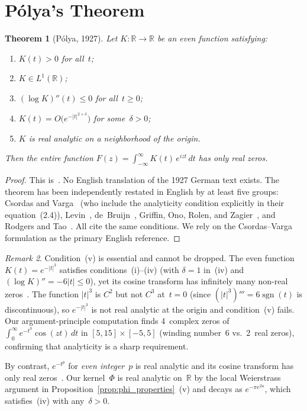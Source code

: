 \documentclass[11pt]{article}
\newtheorem{theorem}{Theorem}
\theoremstyle{definition}
\theoremstyle{remark}
\newtheorem{remark}[theorem]{Remark}
\begin{document}
\section{P\'olya's Theorem}
\label{sec:polya}

\begin{theorem}[P\'olya, 1927]\label{thm:polya}
Let $K : \mathbb{R} \to \mathbb{R}$ be an even function satisfying:
\begin{enumerate}[label=(\roman*)]
\item $K(t) > 0$ for all~$t$;
\item $K \in L^1(\mathbb{R})$;
\item $(\log K)''(t) \leq 0$ for all~$t \geq 0$;
\item $K(t) = O\bigl(e^{-|t|^{2+\delta}}\bigr)$ for some~$\delta > 0$;
\item $K$ is real analytic on a neighborhood of the origin.
\end{enumerate}
Then the entire function $F(z) = \int_{-\infty}^{\infty} K(t)\,e^{izt}\,dt$ has only real zeros.
\end{theorem}

\begin{proof}
This is~\cite[Satz~II]{polya1927}. No English translation of the 1927 German text exists. The theorem has been independently restated in English by at least five groups: Csordas and Varga~\cite[Theorem~2.2]{csordas1989} (who include the analyticity condition explicitly in their equation~(2.4)), Levin~\cite[\S8]{levin1964}, de~Bruijn~\cite{debruijn1950}, Griffin, Ono, Rolen, and Zagier~\cite{griffin2019}, and Rodgers and Tao~\cite{rodgers2020}. All cite the same conditions. We rely on the Csordas--Varga formulation as the primary English reference.
\end{proof}

\begin{remark}
Condition~(v) is essential and cannot be dropped. The even function $K(t) = e^{-|t|^3}$ satisfies conditions~(i)--(iv) (with $\delta = 1$ in~(iv) and $(\log K)'' = -6|t| \leq 0$), yet its cosine transform has infinitely many non-real zeros~\cite[\S2, Example~2.1]{csordas1989}. The function $|t|^3$ is $C^2$ but not $C^3$ at~$t = 0$ (since $(|t|^3)''' = 6\operatorname{sgn}(t)$ is discontinuous), so $e^{-|t|^3}$ is not real analytic at the origin and condition~(v) fails. Our argument-principle computation finds 4~complex zeros of $\int_0^\infty e^{-t^3}\cos(zt)\,dt$ in $[5,15] \times [-5,5]$ (winding number~6 vs.\ 2~real zeros), confirming that analyticity is a sharp requirement.

By contrast, $e^{-t^p}$ for \emph{even integer}~$p$ is real analytic and its cosine transform has only real zeros~\cite[\S2, Example~2.1]{csordas1989}. Our kernel~$\Phi$ is real analytic on~$\mathbb{R}$ by the local Weierstrass argument in Proposition~\ref{prop:phi_properties}~(v) and decays as $e^{-\pi e^{2u}}$, which satisfies~(iv) with any~$\delta > 0$.
\end{remark}
\end{document}
